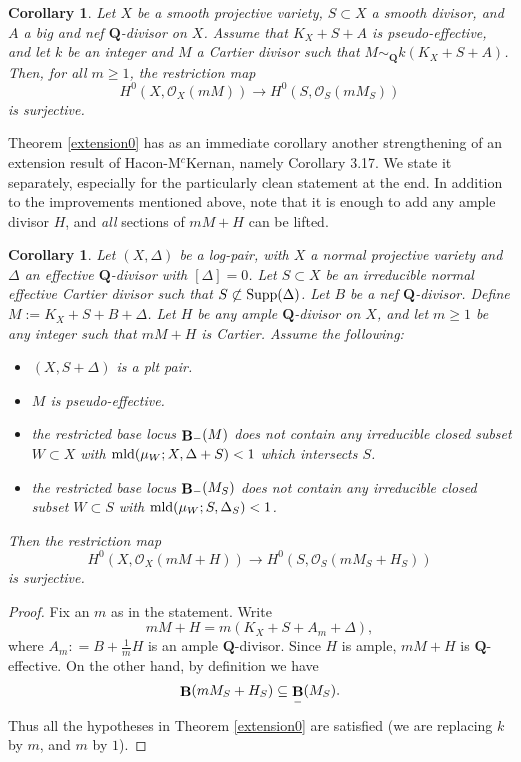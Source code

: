 \documentclass[11pt]{amsart}
\theoremstyle{plain}
\newtheorem{corollaryalpha}[theoremalpha]{Corollary}
\theoremstyle{definition}
\newcommand{\QQ}{\mathbf{Q}}
\newcommand{\OO}{\mathcal  {O}}
\DeclareMathOperator{\BB}{{\bf B}}
\begin{document}
\begin{corollaryalpha}
Let $X$ be a smooth projective variety,  $S\subset X$ a smooth divisor, and $A$ a big and nef $\QQ$-divisor on $X$. Assume that $K_X + S+ A$ is pseudo-effective, and let $k$ be an integer and $M$ a Cartier divisor such that $M \sim_{\QQ} k(K_X + S + A)$. Then, for all $m\ge1$, the restriction map
$$H^0 (X, \OO_X (mM)) \longrightarrow H^0 (S, \OO_S (mM_S))$$
is surjective.
\end{corollaryalpha}




Theorem \ref{extension0} has as an immediate corollary another strengthening of an extension result of Hacon-M$^c$Kernan, namely \cite{hm1} Corollary 3.17. We state it separately, especially for the particularly clean statement at the end. In addition to the improvements mentioned above, note that it is enough to add any ample divisor $H$, and \emph{all} sections of $mM + H$ can be lifted.


\begin{corollaryalpha}\label{extension2}
Let $(X, \Delta)$ be a log-pair, with $X$ a normal projective variety and $\Delta$ an effective $\QQ$-divisor with $[\Delta] = 0$. Let $S \subset X$ be an irreducible normal effective Cartier divisor such that $S \not\subset {\rm Supp}(\Delta)$. 
Let $B$ be a nef $\QQ$-divisor. Define $M := K_X + S + B + \Delta$. Let $H$ be any ample $\QQ$-divisor on $X$, and let $m\ge 1$ be any integer such that $mM + H$ is Cartier. Assume the following:
\begin{itemize}
\item $(X, S +  \Delta)$ is a plt pair. 
\item $M$ is pseudo-effective.
\item the restricted base locus $\BB_{-} (M)$ does not contain any irreducible closed subset $W\subset X$ 
with ${\rm mld}(\mu_W ; X, \Delta+S) < 1$ which intersects $S$. 
\item the restricted base locus $\BB_{-} (M_S)$ does not contain any irreducible closed subset 
$W\subset S$ 
with ${\rm mld}(\mu_W ; S, \Delta_S) < 1$.
\end{itemize}
Then the restriction map
$$H^0 (X, \OO_X (mM+H)) \longrightarrow H^0 (S, \OO_S (mM_S + H_S))$$
is surjective.
\end{corollaryalpha}
\begin{proof}
Fix an $m$ as in the statement. Write 
$$mM + H = m(K_X + S + A_m + \Delta),$$
where $A_m : = B + \frac{1}{m} H$ is an ample $\QQ$-divisor. 
Since $H$ is ample, $mM + H$ is $\QQ$-effective.  On the other hand, by definition we have 
$$\BB (mM_S + H_S) \subseteq \BB_{-} (M_S).$$ 
Thus all the hypotheses in Theorem \ref{extension0} are satisfied (we are replacing $k$ by $m$, and $m$ by $1$).
\end{proof}
\end{document}
